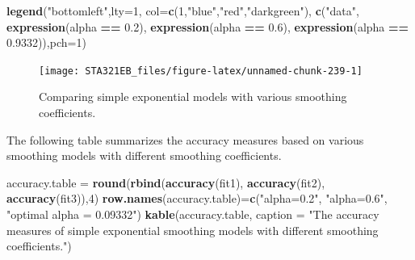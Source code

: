 \documentclass[
]{book}
\newenvironment{Shaded}{\begin{snugshade}}{\end{snugshade}}
\newcommand{\AttributeTok}[1]{\textcolor[rgb]{0.13,0.29,0.53}{#1}}
\newcommand{\DecValTok}[1]{\textcolor[rgb]{0.00,0.00,0.81}{#1}}
\newcommand{\FloatTok}[1]{\textcolor[rgb]{0.00,0.00,0.81}{#1}}
\newcommand{\FunctionTok}[1]{\textcolor[rgb]{0.13,0.29,0.53}{\textbf{#1}}}
\newcommand{\NormalTok}[1]{#1}
\newcommand{\OtherTok}[1]{\textcolor[rgb]{0.56,0.35,0.01}{#1}}
\newcommand{\SpecialCharTok}[1]{\textcolor[rgb]{0.81,0.36,0.00}{\textbf{#1}}}
\newcommand{\StringTok}[1]{\textcolor[rgb]{0.31,0.60,0.02}{#1}}
\begin{document}
\begin{Shaded}
\begin{Highlighting}[]
\FunctionTok{legend}\NormalTok{(}\StringTok{"bottomleft"}\NormalTok{,}\AttributeTok{lty=}\DecValTok{1}\NormalTok{, }\AttributeTok{col=}\FunctionTok{c}\NormalTok{(}\DecValTok{1}\NormalTok{,}\StringTok{"blue"}\NormalTok{,}\StringTok{"red"}\NormalTok{,}\StringTok{"darkgreen"}\NormalTok{),}
  \FunctionTok{c}\NormalTok{(}\StringTok{"data"}\NormalTok{, }\FunctionTok{expression}\NormalTok{(alpha }\SpecialCharTok{==} \FloatTok{0.2}\NormalTok{), }\FunctionTok{expression}\NormalTok{(alpha }\SpecialCharTok{==} \FloatTok{0.6}\NormalTok{),}
  \FunctionTok{expression}\NormalTok{(alpha }\SpecialCharTok{==}  \FloatTok{0.9332}\NormalTok{)),}\AttributeTok{pch=}\DecValTok{1}\NormalTok{)}
\end{Highlighting}
\end{Shaded}

\begin{figure}

{\centering \texttt{[image: STA321EB\_files/figure-latex/unnamed-chunk-239-1]} 

}

\caption{Comparing simple exponential models with various smoothing coefficients.}\label{fig:unnamed-chunk-239}
\end{figure}

The following table summarizes the accuracy measures based on various smoothing models with different smoothing coefficients.

\begin{Shaded}
\begin{Highlighting}[]
\NormalTok{accuracy.table }\OtherTok{=} \FunctionTok{round}\NormalTok{(}\FunctionTok{rbind}\NormalTok{(}\FunctionTok{accuracy}\NormalTok{(fit1), }\FunctionTok{accuracy}\NormalTok{(fit2), }\FunctionTok{accuracy}\NormalTok{(fit3)),}\DecValTok{4}\NormalTok{)}
\FunctionTok{row.names}\NormalTok{(accuracy.table)}\OtherTok{=}\FunctionTok{c}\NormalTok{(}\StringTok{"alpha=0.2"}\NormalTok{, }\StringTok{"alpha=0.6"}\NormalTok{, }\StringTok{"optimal alpha = 0.09332"}\NormalTok{)}
\FunctionTok{kable}\NormalTok{(accuracy.table, }\AttributeTok{caption =} \StringTok{"The accuracy measures of simple exponential }
\StringTok{      smoothing models with different smoothing coefficients."}\NormalTok{)}
\end{Highlighting}
\end{Shaded}
\end{document}
